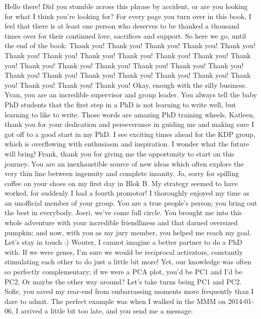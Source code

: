 Hello there! Did you stumble across this phrase by accident, 
or are you looking for what I think you're looking for?
For every page you turn over in this book,
I feel that there is at least one person who deserves to be thanked 
a thousand times over for their continued love, sacrifices and support.
So here we go, until the end of the book: Thank you! Thank you!
Thank you! Thank you! Thank you! Thank you! Thank you! Thank you! 
Thank you! Thank you! Thank you! Thank you! Thank you! Thank you!
Thank you! Thank you! Thank you! Thank you! Thank you! Thank you!
Thank you! Thank you! Thank you! Thank you! Thank you! Thank you!
Thank you! Thank you! Okay, enough with the silly business.
\newperson
\newperson
Yvan, you are an incredible supervisor and group leader.
You always tell the baby PhD students that the first step in a PhD
is not learning to write well, but learning to like to write.
Those words are amazing PhD training wheels.
\newperson
\newperson
Katleen, thank you for your dedication and perseverance
in guiding me and making sure I got off to a good start in my PhD.
I see exciting times ahead for the KDP group, which is overflowing
with enthusiasm and inspiration. I wonder what the future will bring!
\newperson
\newperson
Frank, thank you for giving me the opportunity to start on this journey.
You are an inexhaustible source of new ideas
which often explore the very thin line
between ingenuity and complete insanity.
\newperson
\newperson
Jo, sorry for spilling coffee on your shoes on my first day in Blok B.
My strategy seemed to have worked, for suddenly I had a fourth promotor!
I thoroughly enjoyed my time as an unofficial member of your group.
You are a true people's person; you bring out the best in everybody.
\newperson
\newperson
Joeri, we've come full circle. You brought me into this whole adventure
with your incredible friendliness and that darned oversized pumpkin;
and now, with you as my jury member, you helped me reach my goal.
Let's stay in touch :)
\newperson
\newperson
Wouter, I cannot imagine a better partner to do a PhD with.
If we were genes, I'm sure we would be reciprocal activators,
constantly stimulating each other to do just a little bit more!
Yet, our knowledge was often so perfectly complementary;
if we were a PCA plot, you'd be PC1 and I'd be PC2.
Or maybe the other way around? Let's take turns being PC1 and PC2.
\newperson
\newperson
Sofie, you saved my rear-end from embarrassing moments more frequently than I dare to admit.
The perfect example was when I walked in the MMM on 2014-01-06,
I arrived a little bit too late, and you send me a message:
